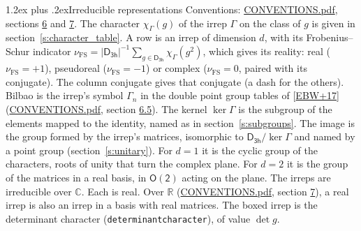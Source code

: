 \documentclass[10pt,a4paper]{article}
\makeatletter
\renewcommand\section{\@startsection{section}{1}{\z@}{-3ex plus -1ex minus -.2ex}%
  {1.2ex plus .2ex}{\normalfont\large\sffamily\bfseries\color{parttitle}}}
\numberwithin{equation}{section}
\newcommand{\grp}[1]{\mathsf{#1}}
\newcommand{\irchar}[1]{\chi_{#1}}
\newcommand{\fsind}{\nu_{\mathrm{FS}}}
\makeatother
\begin{document}
\section{Irreducible representations}\label{s:irreps}
Conventions: \href{../../CONVENTIONS.pdf}{CONVENTIONS.pdf}, sections \href{../../CONVENTIONS.pdf\#conv.6}{6} and \href{../../CONVENTIONS.pdf\#conv.7}{7}.
\leavevmode\label{n:function.character}\label{n:irrep.Gamma}The character $\irchar{\Gamma}(g)$ of the irrep $\Gamma$ on the class of $g$ is given in section~\ref{s:character_table}.
\leavevmode\label{n:index.dimension}\label{n:index.frobenius}\label{n:head.irrep}\label{n:head.reality}A row is an irrep of dimension $d$, with its Frobenius--Schur indicator $\fsind = |\grp{D_{3h}}|^{-1}\allowbreak\sum_{g\in\grp{D_{3h}}}\irchar{\Gamma}(g^2)$, which gives its reality: real ($\fsind = +1$), pseudoreal ($\fsind = -1$) or complex ($\fsind = 0$, paired with its conjugate). \label{n:head.conjugate}The column conjugate gives that conjugate (a dash for the others). \label{n:head.bilbao}\label{n:irrep.alias.gamma}Bilbao is the irrep's symbol $\Gamma_n$ in the double point group tables of [\href{../../../REFERENCES.pdf\#ref.EBW+17}{EBW+17}] (\href{../../CONVENTIONS.pdf}{CONVENTIONS.pdf}, section \href{../../CONVENTIONS.pdf\#conv.6.5}{6.5}). \label{n:head.kernel}The kernel $\ker\Gamma$ is the subgroup of the elements mapped to the identity, named as in section~\ref{s:subgroups}. \label{n:head.image}The image is the group formed by the irrep's matrices, isomorphic to $\grp{D_{3h}}/\ker\Gamma$ and named by a point group (section~\ref{s:unitary}). For $d = 1$ it is the cyclic group of the characters, roots of unity that turn the complex plane. For $d = 2$ it is the group of the matrices in a real basis, in $\grp{O(2)}$ acting on the plane. The irreps are irreducible over $\mathbb{C}$. Each is real. Over $\mathbb{R}$ (\href{../../CONVENTIONS.pdf}{CONVENTIONS.pdf}, section \href{../../CONVENTIONS.pdf\#conv.7}{7}), a real irrep is also an irrep in a basis with real matrices. \label{n:mark.determinant}The boxed irrep is the determinant character (\texttt{determinantcharacter}), of value $\det g$.
\setlength{\emergencystretch}{2em}\par\setlength{\emergencystretch}{0pt}
\end{document}
